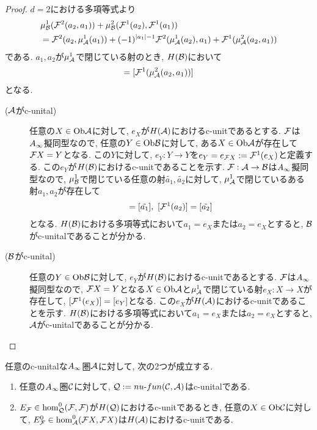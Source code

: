 \documentclass[uplatex, a4paper, 14Q, dvipdfmx]{jsarticle}
\begin{document}
\begin{proof}
  $d=2$における多項等式より
  \begin{align*}
    &\mu^1_{\mathcal{B}}(\mathcal{F}^2(a_2,a_1)) + \mu^2_{\mathcal{B}}(\mathcal{F}^1(a_2), \mathcal{F}^1(a_1)) \\
    &= \mathcal{F}^2(a_2,\mu^1_{\mathcal{A}}(a_1)) + (-1)^{|a_1|-1} \mathcal{F}^2(\mu^1_{\mathcal{A}}(a_2),a_1) + \mathcal{F}^1(\mu^2_{\mathcal{A}}(a_2,a_1))
  \end{align*}
  である. 
  $a_1,a_2$が$\mu^1_{\mathcal{A}}$で閉じている射のとき, $H(\mathcal{B})$において
  \begin{align*}
    [\mu^2_\B(\F^1(a_2), \F^1(a_1))]
    = [\F^1(\mu^2_\A(a_2,a_1))]
  \end{align*}
  となる. 
  \begin{description}
    \item[($\mathcal{A}$がc-unital)] 任意の$X \in \mathrm{Ob}\mathcal{A}$に対して, $e_X$が$H(\mathcal{A})$におけるc-unitであるとする.
    $\mathcal{F}$は$A_{\infty}$擬同型なので, 任意の$Y \in \mathrm{Ob}\mathcal{B}$に対して, ある$X \in \mathrm{Ob}\mathcal{A}$が存在して$\mathcal{F} X = Y$となる.
    この$Y$に対して, $e_Y : Y \to Y$を$e_Y=e_{\mathcal{F} X} := \mathcal{F}^1(e_X)$と定義する. 
    この$e_Y$が$H(\mathcal{B})$におけるc-unitであることを示す. 
    $\mathcal{F} : \mathcal{A} \to \mathcal{B}$は$A_{\infty}$擬同型なので, $\mu^1_{\mathcal{B}}$で閉じている任意の射$\tilde{a_1}, \tilde{a_2}$に対して, $\mu^1_{\mathcal{A}}$で閉じているある射$a_1,a_2$が存在して
    \begin{align*}
      [\F^1(a_1)] = [\tilde{a_1}], ~  [\F^1(a_2)] = [\tilde{a_2}]
    \end{align*}
    となる. 
    $H(\mathcal{B})$における多項等式において$a_1=e_X$または$a_2=e_X$とすると, $\mathcal{B}$がc-unitalであることが分かる. 
    \item[($\mathcal{B}$がc-unital)] 任意の$Y \in \mathrm{Ob}\mathcal{B}$に対して, $e_Y$が$H(\mathcal{B})$におけるc-unitであるとする.
    $\mathcal{F}$は$A_{\infty}$擬同型なので, $\mathcal{F} X = Y$となる$X \in \mathrm{Ob}\mathcal{A}$と$\mu_{\mathcal{A}}^1$で閉じている射$e_X : X \to X$が存在して, $[\mathcal{F}^1(e_X)]=[e_Y]$となる.
    この$e_X$が$H(\mathcal{A})$におけるc-unitであることを示す. 
    $H(\mathcal{B})$における多項等式において$a_1=e_X$または$a_2=e_X$とすると, $\mathcal{A}$がc-unitalであることが分かる. 
  \end{description}
\end{proof}

\begin{theorem} \label{prop_nufun_is_also_c-unital}
  任意のc-unitalな$A_{\infty}$圏$\mathcal{A}$に対して, 次の2つが成立する. 
  \begin{enumerate}
    \item 任意の$A_{\infty}$圏$\mathcal{C}$に対して, $\mathcal{Q} := nu \text{-} fun (\mathcal{C}, \mathcal{A})$はc-unitalである. 
    \item $E_{\mathcal{F}} \in \hom^0_{\mathcal{Q}}(\mathcal{F},\mathcal{F})$が$H(\mathcal{Q})$におけるc-unitであるとき, 任意の$X \in \mathrm{Ob}\mathcal{C}$に対して, $E^0_{\mathcal{F}} \in \hom^0_{\mathcal{A}}(\mathcal{F} X,\mathcal{F} X)$は$H(\mathcal{A})$におけるc-unitである. 
  \end{enumerate}
\end{theorem}
\end{document}
